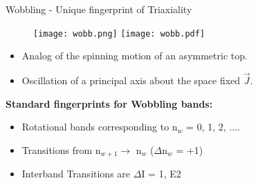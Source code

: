 \documentclass [aspectratio=169]{beamer}
\begin{document}
\begin{frame}{Wobbling - Unique fingerprint of Triaxiality}
\vspace{-10pt}
\begin{center}
\begin{figure}
\texttt{[image: wobb.png]}
\hspace{50pt}
\texttt{[image: wobb.pdf]}
\end{figure}
\end{center}
\vspace{-10pt}
\begin{itemize}
\item {\small{Analog of the spinning motion of an asymmetric top.}}
\item {\small{Oscillation of a principal axis about the space fixed \textbf{$\vec{J}$}.}}
\end{itemize}
\vspace{-4pt}
\textbf{Standard fingerprints for Wobbling bands:}
\begin{itemize}
\item{\small{Rotational bands corresponding to n$_{w}$ = 0, 1, 2, ....}}
\item{\small{Transitions from n$_{w+1} \rightarrow$ n$_{w}$ ($\Delta$n$_{w}$ = +1)}}
\item{\small{Interband Transitions are $\Delta\mathrm{I}$ = 1, E2}}
\end{itemize}
\end{frame}
\end{document}
